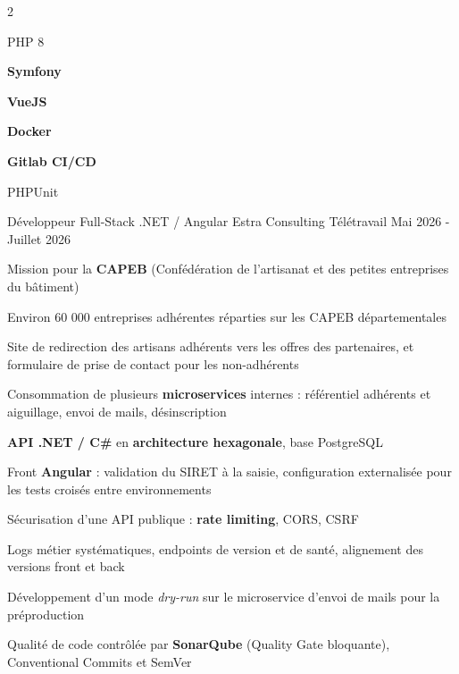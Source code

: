 \begin{cventries}
\begin{cvexperience}
		\vspace{-5mm}
		\begin{multicols}{2}
			\begin{cvitems}
				\item PHP 8
				\item \textbf{Symfony}
				\item \textbf{VueJS}
				\item \textbf{Docker}
				\item \textbf{Gitlab CI/CD}
				\item PHPUnit
			\end{cvitems}
		\end{multicols}
	\end{cvexperience}

	\begin{cvexperience}
		\cvbigentry
		{Développeur Full-Stack .NET / Angular} %
		{Estra Consulting} %
		{Télétravail} %
		{Mai 2026 - Juillet 2026} %
		{
			\vspace{2mm}
			\begin{cvitems} %
				\item {Mission pour la \textbf{CAPEB} (Confédération de l'artisanat et des petites entreprises du bâtiment)}
				\item {Environ 60 000 entreprises adhérentes réparties sur les CAPEB départementales}
			\end{cvitems}
		}

		\begin{cvitems}
			\item {Site de redirection des artisans adhérents vers les offres des partenaires, et formulaire de prise de contact pour les non-adhérents}
			\item {Consommation de plusieurs \textbf{microservices} internes : référentiel adhérents et aiguillage, envoi de mails, désinscription}
			\item {\textbf{API .NET / C\#} en \textbf{architecture hexagonale}, base PostgreSQL}
			\item {Front \textbf{Angular} : validation du SIRET à la saisie, configuration externalisée pour les tests croisés entre environnements}
			\item {Sécurisation d'une API publique : \textbf{rate limiting}, CORS, CSRF}
			\item {Logs métier systématiques, endpoints de version et de santé, alignement des versions front et back}
			\item {Développement d'un mode \textit{dry-run} sur le microservice d'envoi de mails pour la préproduction}
			\item {Qualité de code contrôlée par \textbf{SonarQube} (Quality Gate bloquante), Conventional Commits et SemVer}
		\end{cvitems}


\end{cvexperience}
\end{cventries}
